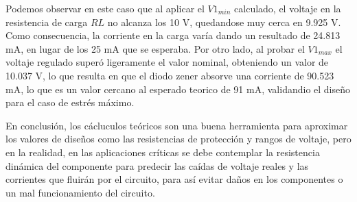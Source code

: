 \documentclass[journal]{IEEEtran}
\begin{document}
Podemos observar en este caso que al aplicar el $V1_{min}$ calculado, el voltaje en la resistencia de carga $RL$ no alcanza los 10 V, quedandose muy cerca en 9.925 V. Como consecuencia, la corriente en la carga varía 
dando un resultado de 24.813 mA, en lugar de los 25 mA que se esperaba. Por otro lado, al probar el $V1_{max}$ el voltaje regulado superó ligeramente el valor nominal, obteniendo un valor de 10.037 V, lo que
resulta en que el diodo zener absorve una corriente de 90.523 mA, lo que es un valor cercano al esperado teorico de 91 mA, validandio el diseño para el caso de estrés máximo.

En conclusión, los cácluculos teóricos son una buena herramienta para aproximar los valores de diseños como las resistencias de protección y rangos de voltaje, pero en la realidad, en las aplicaciones críticas se debe contemplar la
resistencia dinámica del componente para predecir las caídas de voltaje reales y las corrientes que fluirán por el circuito, para así evitar daños en los componentes o un mal funcionamiento del circuito.
\end{document}
